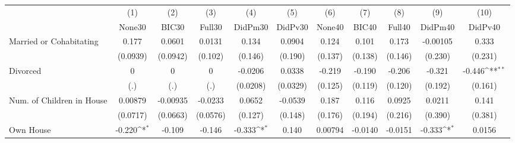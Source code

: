 {
\def\sym#1{\ifmmode^{#1}\else\(^{#1}\)\fi}
\begin{tabular}{l*{10}{c}}
\toprule
            &\multicolumn{1}{c}{(1)}&\multicolumn{1}{c}{(2)}&\multicolumn{1}{c}{(3)}&\multicolumn{1}{c}{(4)}&\multicolumn{1}{c}{(5)}&\multicolumn{1}{c}{(6)}&\multicolumn{1}{c}{(7)}&\multicolumn{1}{c}{(8)}&\multicolumn{1}{c}{(9)}&\multicolumn{1}{c}{(10)}\\
            &\multicolumn{1}{c}{None30}&\multicolumn{1}{c}{BIC30}&\multicolumn{1}{c}{Full30}&\multicolumn{1}{c}{DidPm30}&\multicolumn{1}{c}{DidPv30}&\multicolumn{1}{c}{None40}&\multicolumn{1}{c}{BIC40}&\multicolumn{1}{c}{Full40}&\multicolumn{1}{c}{DidPm40}&\multicolumn{1}{c}{DidPv40}\\
\midrule
Married or Cohabitating&       0.177         &      0.0601         &      0.0131         &       0.134         &      0.0904         &       0.124         &       0.101         &       0.173         &    -0.00105         &       0.333         \\
            &    (0.0939)         &    (0.0942)         &     (0.102)         &     (0.146)         &     (0.190)         &     (0.137)         &     (0.138)         &     (0.146)         &     (0.230)         &     (0.231)         \\
\addlinespace
Divorced    &           0         &           0         &           0         &     -0.0206         &      0.0338         &      -0.219         &      -0.190         &      -0.206         &      -0.321         &      -0.446\sym{**} \\
            &         (.)         &         (.)         &         (.)         &    (0.0208)         &    (0.0329)         &     (0.125)         &     (0.119)         &     (0.120)         &     (0.192)         &     (0.161)         \\
\addlinespace
Num. of Children in House&     0.00879         &    -0.00935         &     -0.0233         &      0.0652         &     -0.0539         &       0.187         &       0.116         &      0.0925         &      0.0211         &       0.141         \\
            &    (0.0717)         &    (0.0663)         &    (0.0576)         &     (0.127)         &     (0.148)         &     (0.176)         &     (0.194)         &     (0.216)         &     (0.390)         &     (0.381)         \\
\addlinespace
Own House   &      -0.220\sym{*}  &      -0.109         &      -0.146         &      -0.333\sym{*}  &       0.140         &     0.00794         &     -0.0140         &     -0.0151         &      -0.333\sym{*}  &      0.0156         \\

\end{tabular}}
